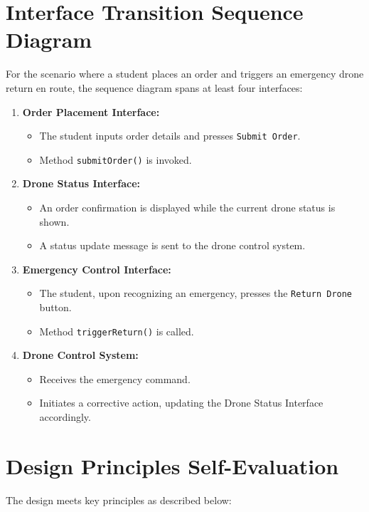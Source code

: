 \documentclass{article}
\begin{document}
\section{Interface Transition Sequence Diagram}
For the scenario where a student places an order and triggers an emergency drone return en route, the sequence diagram spans at least four interfaces:

\begin{enumerate}
    \item \textbf{Order Placement Interface:}
    \begin{itemize}
        \item The student inputs order details and presses \texttt{Submit Order}.
        \item Method \texttt{submitOrder()} is invoked.
    \end{itemize}
    
    \item \textbf{Drone Status Interface:}
    \begin{itemize}
        \item An order confirmation is displayed while the current drone status is shown.
        \item A status update message is sent to the drone control system.
    \end{itemize}
    
    \item \textbf{Emergency Control Interface:}
    \begin{itemize}
        \item The student, upon recognizing an emergency, presses the \texttt{Return Drone} button.
        \item Method \texttt{triggerReturn()} is called.
    \end{itemize}
    
    \item \textbf{Drone Control System:}
    \begin{itemize}
        \item Receives the emergency command.
        \item Initiates a corrective action, updating the Drone Status Interface accordingly.
    \end{itemize}
\end{enumerate}

\section{Design Principles Self-Evaluation}
The design meets key principles as described below:
\end{document}

